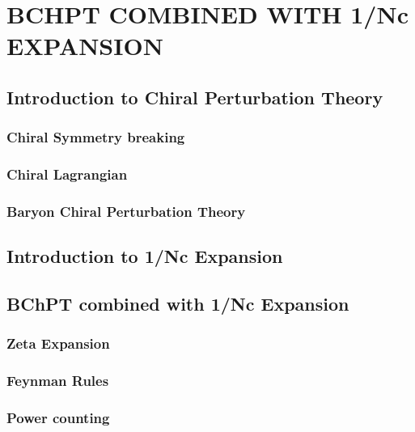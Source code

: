 \chapter{BCHPT COMBINED WITH 1/Nc EXPANSION}

\section{Introduction to Chiral Perturbation Theory}

\subsection{Chiral Symmetry breaking}
\subsection{Chiral Lagrangian}
\subsection{Baryon Chiral Perturbation Theory}




\section{Introduction to 1/Nc Expansion}


\section{BChPT combined with 1/Nc Expansion}

\subsection{Zeta Expansion}
\subsection{Feynman Rules}
\subsection{Power counting}

